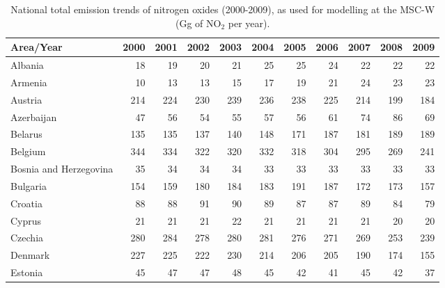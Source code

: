  \begin{table}
 \caption{National total emission trends of  nitrogen oxides (2000-2009), as used for modelling at the MSC-W (Gg of NO$_2$ per year).}
 
 \vspace{15pt}
 
 \scriptsize
 \centering
 \begin{tabular}{|l|r|r|r|r|r|r|r|r|r|r|}
 \hline
                     Area/Year&   2000&   2001&   2002&   2003&   2004&   2005&   2006&   2007&   2008&   2009\\\hline\hline
                       Albania&     18&     19&     20&     21&     25&     25&     24&     22&     22&     22\\\hline
                       Armenia&     10&     13&     13&     15&     17&     19&     21&     24&     23&     23\\\hline
                       Austria&    214&    224&    230&    239&    236&    238&    225&    214&    199&    184\\\hline
                    Azerbaijan&     47&     56&     54&     55&     57&     56&     61&     74&     86&     69\\\hline
                       Belarus&    135&    135&    137&    140&    148&    171&    187&    181&    189&    189\\\hline
                       Belgium&    344&    334&    322&    320&    332&    318&    304&    295&    269&    241\\\hline
        Bosnia and Herzegovina&     35&     34&     34&     34&     33&     33&     33&     33&     33&     33\\\hline
                      Bulgaria&    154&    159&    180&    184&    183&    191&    187&    172&    173&    157\\\hline
                       Croatia&     88&     88&     91&     90&     89&     87&     87&     89&     84&     79\\\hline
                        Cyprus&     21&     21&     21&     22&     21&     21&     21&     21&     20&     20\\\hline
                       Czechia&    280&    284&    278&    280&    281&    276&    271&    269&    253&    239\\\hline
                       Denmark&    227&    225&    222&    230&    214&    206&    205&    190&    174&    155\\\hline
                       Estonia&     45&     47&     47&     48&     45&     42&     41&     45&     42&     37\\\hline

\end{tabular}
\end{table}

